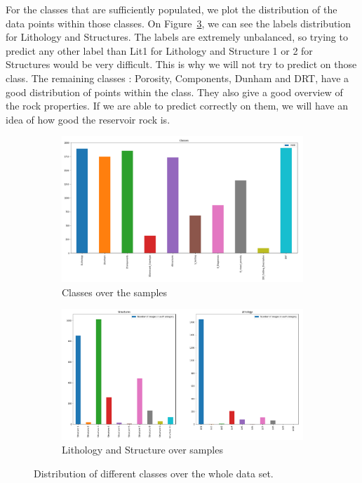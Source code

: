  For the classes that are sufficiently populated, we plot the distribution of the data points within those classes. On Figure~\ref{fig:litandstruct}, we can see the labels distribution for Lithology and Structures. The labels are extremely unbalanced, so trying to predict any other label than Lit1 for Lithology and Structure 1 or 2 for Structures would be very difficult. This is why we will not try to predict on those class. 
 The remaining classes : Porosity, Components, Dunham and DRT, have a good distribution of points within the class. They also give a good overview of the rock properties. If we are able to predict correctly on them, we will have an idea of how good the reservoir rock is. 
\begin{figure}
\begin{subfigure}{.5\textwidth}
  \centering
  \includegraphics[width=.8\linewidth]{figures/03-classes.png}
  \caption{Classes over the samples}
  \label{fig:classes}
\end{subfigure}%
\begin{subfigure}{.5\textwidth}
  \centering
  \includegraphics[width=.8\linewidth]{figures/03-boob.PNG}
  \caption{Lithology and Structure over samples}
  \label{fig:litandstruct}
\end{subfigure}
\caption[Classes distributions]{Distribution of different classes over the whole data set.}
\end{figure}



